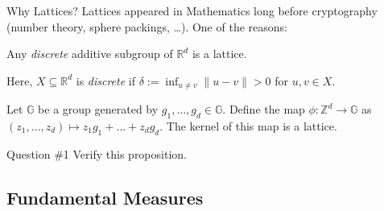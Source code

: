 \documentclass{zkdl-presentation-template}
\begin{document}
    \begin{frame}{Why Lattices?}
        Lattices appeared in Mathematics long before cryptography (number theory, sphere packings, \ldots). One of the reasons:
        \begin{lemma}
            Any \emph{discrete} additive subgroup of $\mathbb{R}^d$ is a lattice.
        \end{lemma}
        Here, $X \subseteq \mathbb{R}^d$ is \emph{discrete} if $\delta := \inf_{u \neq v}\|u-v\| > 0$ for $u,v \in X$.
        \pause

        \begin{proposition}
            Let $\mathbb{G}$ be a group generated by $g_1,\dots,g_d \in \mathbb{G}$.
            Define the map $\phi: \mathbb{Z}^d \to \mathbb{G}$ as $(z_1,\dots,z_d) \mapsto z_1g_1 + \dots + z_dg_d$.
            The kernel of this map is a lattice.
        \end{proposition}
        \pause

        \begin{questionblock}{Question \#1}
            Verify this proposition.
        \end{questionblock}
    \end{frame}

    \subsection{Fundamental Measures}
\end{document}
